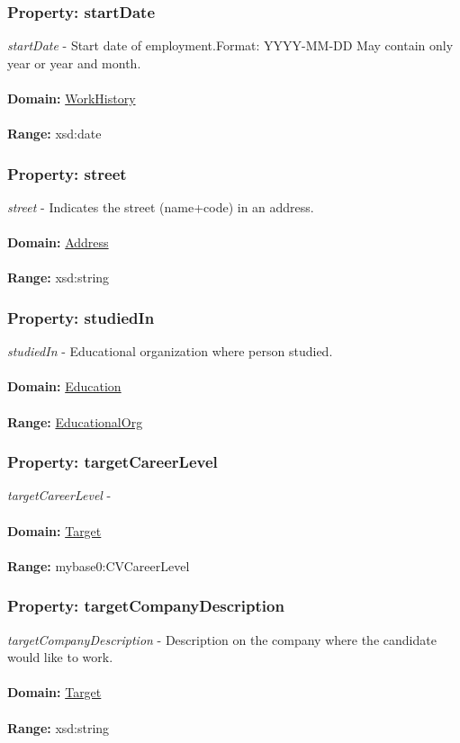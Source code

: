 \documentclass[a4paper,12pt]{article}
\numberwithin{equation}{section}
\begin{document}
\subsubsection{Property: startDate}\hypertarget{startDate}{}
\textit{startDate} - Start date of employment.Format: YYYY-MM-DD May contain only year or year and month.
\\\\
\textbf{Domain:} \hyperlink{WorkHistory}{WorkHistory} 
\\\\
\textbf{Range:}  xsd:date

\subsubsection{Property: street}\hypertarget{street}{}
\textit{street} - Indicates the street (name+code) in an address.
\\\\
\textbf{Domain:} \hyperlink{Address}{Address} 
\\\\
\textbf{Range:}  xsd:string

\subsubsection{Property: studiedIn}\hypertarget{studiedIn}{}
\textit{studiedIn} - Educational organization where person studied.
\\\\
\textbf{Domain:} \hyperlink{Education}{Education} 
\\\\
\textbf{Range:}  \hyperlink{EducationalOrg}{EducationalOrg} 

\subsubsection{Property: targetCareerLevel}\hypertarget{targetCareerLevel}{}
\textit{targetCareerLevel} - 
\\\\
\textbf{Domain:} \hyperlink{Target}{Target} 
\\\\
\textbf{Range:}  mybase0:CVCareerLevel 

\subsubsection{Property: targetCompanyDescription}\hypertarget{targetCompanyDescription}{}
\textit{targetCompanyDescription} - Description on the company where the candidate would like to work.
\\\\
\textbf{Domain:} \hyperlink{Target}{Target} 
\\\\
\textbf{Range:}  xsd:string 
\end{document}
